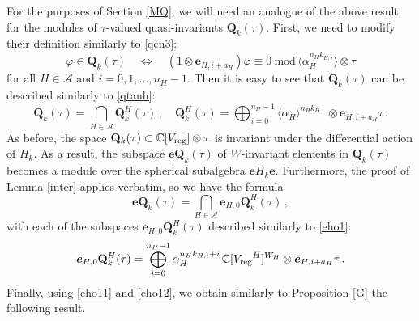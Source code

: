 \documentclass{amsart}
\newtheorem{prop}[theorem]{Proposition}
\theoremstyle{definition}
\theoremstyle{remark}
\numberwithin{equation}{section}
\begin{document}
For the purposes of Section \ref{MQ}, we will need an analogue of
the above result for the modules of $\tau$-valued quasi-invariants
${\mathbf{Q}}_k(\tau)$. First, we need to modify their definition similarly
to \eqref{qcn3}:
\begin{equation}
\label{qcn31} \varphi \in {\mathbf{Q}}_k(\tau) \quad \Longleftrightarrow\quad
(1\otimes{\boldsymbol{e}}_{H,i+a_H}) \varphi \equiv 0\
\mbox{mod}\,\langle\alpha_H^{n_Hk_{H,i}}\rangle\otimes\tau
\end{equation}
for all $H\in {\mathcal{A}} $ and $i=0,1,\ldots, n_H-1$. Then it is easy to
see that ${\mathbf{Q}}_k(\tau)$ can be described similarly to \eqref{qtauh}:
\begin{equation}\label{qttauh}
{\mathbf{Q}}_k(\tau)=\bigcap_{H \in {\mathcal{A}}}{\mathbf{Q}}_k^H(\tau)\,,\quad
{\mathbf{Q}}_k^H(\tau)=\bigoplus_{i=0}^{n_H-1}
\langle\alpha_H\rangle^{n_Hk_{H,i}}\,\otimes {\boldsymbol{e}}_{H,i+a_H}\tau\,.
\end{equation}
As before, the space ${\mathbf{Q}}_k(\tau)\subset {\mathbb{C}}[{V_{\rm{reg}}}]\otimes\tau$ is
invariant under the differential action of $H_k$. As a result, the
subspace ${\boldsymbol{e}}{\mathbf{Q}}_k(\tau)$ of $W$-invariant elements in ${\mathbf{Q}}_k(\tau)$
becomes a module over the spherical subalgebra ${\boldsymbol{e}} H_k {\boldsymbol{e}}$.
Furthermore, the proof of Lemma \ref{inter} applies verbatim, so we
have the formula
\begin{equation}\label{eho11}
{\boldsymbol{e}}{\mathbf{Q}}_k(\tau)=\bigcap_{H\in{\mathcal{A}}}{\boldsymbol{e}}_{H,0}{\mathbf{Q}}_k^H(\tau)\,,
\end{equation}
with each of the subspaces ${\boldsymbol{e}}_{H,0}{\mathbf{Q}}_k^H(\tau)$ described
similarly to \eqref{eho1}:
\begin{equation}\label{eho12}
{\boldsymbol{e}}_{H,0}{\mathbf{Q}}_k^H(\tau)=\bigoplus_{i=0}^{n_H-1}
\alpha_H^{n_Hk_{H,i}+i}\,{\mathbb{C}}[{V_{\rm{reg}}}^H]^{W_H}\otimes{\boldsymbol{e}}_{H,i+a_H}\tau\,.
\end{equation}
Finally, using \eqref{eho11} and \eqref{eho12}, we obtain similarly
to Proposition \ref{G} the following result.

\end{document}
